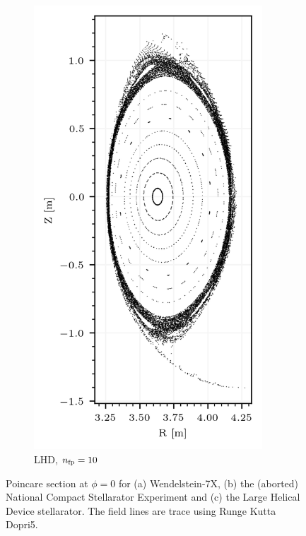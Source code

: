 \begin{figure}[H]
\begin{subfigure}[c]{0.32\textwidth}
        \includegraphics[width=0.94\textwidth]{images/theory/lhd.png}
        \caption{LHD, $n_\text{fp} = 10$}
        \label{fig:enter-label}
    \end{subfigure}

    \caption{Poincare section at $\phi = 0$ for (a) Wendelstein-7X, (b) the (aborted) National Compact Stellarator Experiment and (c) the Large Helical Device stellarator. The field lines are trace using Runge Kutta Dopri5.}\label{fig:poincare-example}
    \label{fig:enter-label}
\end{figure}

